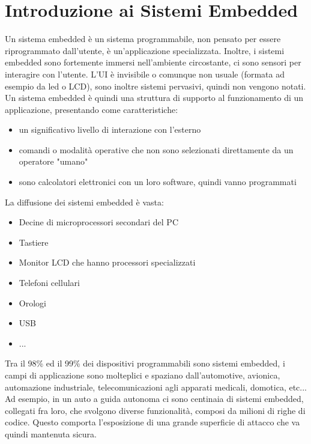 \documentclass[12pt, oneside]{extbook}
\begin{document}
\Large
\tableofcontents
\section{Introduzione ai Sistemi Embedded}
Un sistema embedded è un sistema programmabile, non pensato per essere riprogrammato dall'utente, è un'applicazione specializzata. Inoltre, i sistemi embedded sono fortemente immersi nell'ambiente circostante, ci sono sensori per interagire con l'utente. L'UI è invisibile o comunque non usuale (formata ad esempio da led o LCD), sono inoltre sistemi pervasivi, quindi non vengono notati.\\ Un sistema embedded è quindi una struttura di supporto al funzionamento di un applicazione, presentando come caratteristiche:
\begin{itemize}
\item un significativo livello di interazione con l'esterno
\item comandi o modalità operative che non sono selezionati direttamente da un operatore "umano"
\item sono calcolatori elettronici con un loro software, quindi vanno programmati
\end{itemize}
La diffusione dei sistemi embedded è vasta:
\begin{itemize}
\item Decine di microprocessori secondari del PC
\item Tastiere
\item Monitor LCD che hanno processori specializzati
\item Telefoni cellulari
\item Orologi
\item USB
\item ...
\end{itemize}
Tra il 98\% ed il 99\% dei dispositivi programmabili sono sistemi embedded, i campi di applicazione sono molteplici e spaziano dall'automotive, avionica, automazione industriale, telecomunicazioni agli apparati medicali, domotica, etc...\\ Ad esempio, in un auto a guida autonoma ci sono centinaia di sistemi embedded, collegati fra loro, che svolgono diverse funzionalità, composi da milioni di righe di codice. Questo comporta l'esposizione di una grande superficie di attacco che va quindi mantenuta sicura.
\end{document}
